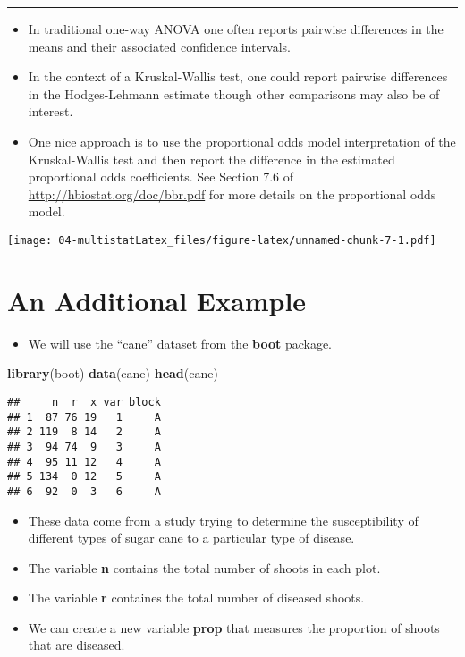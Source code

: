 \documentclass[]{book}
\newenvironment{Shaded}{\begin{snugshade}}{\end{snugshade}}
\newcommand{\KeywordTok}[1]{\textcolor[rgb]{0.13,0.29,0.53}{\textbf{#1}}}
\newcommand{\NormalTok}[1]{#1}
\providecommand{\tightlist}{%
  \setlength{\itemsep}{0pt}\setlength{\parskip}{0pt}}
\begin{document}
\begin{center}\rule{0.5\linewidth}{\linethickness}\end{center}

\begin{itemize}
\item
  In traditional one-way ANOVA one often reports pairwise differences
  in the means and their associated confidence intervals.
\item
  In the context of a Kruskal-Wallis test, one could
  report pairwise differences in the Hodges-Lehmann estimate
  though other comparisons may also be of interest.
\item
  One nice approach is to use the proportional odds model
  interpretation of the Kruskal-Wallis test and
  then report the difference in the estimated proportional odds coefficients.
  See Section 7.6 of \url{http://hbiostat.org/doc/bbr.pdf} for more details
  on the proportional odds model.
\end{itemize}

\texttt{[image: 04-multistatLatex\_files/figure-latex/unnamed-chunk-7-1.pdf]}

\hypertarget{an-additional-example}{%
\section{An Additional Example}\label{an-additional-example}}

\begin{itemize}
\tightlist
\item
  We will use the ``cane'' dataset from the \textbf{boot} package.
\end{itemize}

\begin{Shaded}
\begin{Highlighting}[]
\KeywordTok{library}\NormalTok{(boot)}
\KeywordTok{data}\NormalTok{(cane)}
\KeywordTok{head}\NormalTok{(cane)}
\end{Highlighting}
\end{Shaded}

\begin{verbatim}
##     n  r  x var block
## 1  87 76 19   1     A
## 2 119  8 14   2     A
## 3  94 74  9   3     A
## 4  95 11 12   4     A
## 5 134  0 12   5     A
## 6  92  0  3   6     A
\end{verbatim}

\begin{itemize}
\item
  These data come from a study trying to determine the susceptibility of different types
  of sugar cane to a particular type of disease.
\item
  The variable \textbf{n} contains the total number of shoots in each plot.
\item
  The variable \textbf{r} containes the total number of diseased shoots.
\item
  We can create a new variable \textbf{prop} that measures the proportion
  of shoots that are diseased.
\end{itemize}
\end{document}
